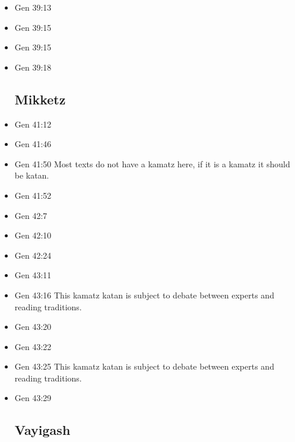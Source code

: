 \documentclass[14pt]{book}
\begin{document}
\begin{multicols}{2}
\begin{itemize}
\item Gen 39:13

\item Gen 39:15

\item Gen 39:15

\item Gen 39:18

\subsection{Mikketz}

\item Gen 41:12

\item Gen 41:46

\item Gen 41:50 Most texts do not have a kamatz here, if it is a kamatz it should be katan.

\item Gen 41:52

\item Gen 42:7

\item Gen 42:10

\item Gen 42:24

\item Gen 43:11

\item Gen 43:16 This kamatz katan is subject to debate between experts and reading traditions.

\item Gen 43:20

\item Gen 43:22

\item Gen 43:25 This kamatz katan is subject to debate between experts and reading traditions.

\item Gen 43:29

\subsection{Vayigash}


\end{itemize}
\end{multicols}
\end{document}
